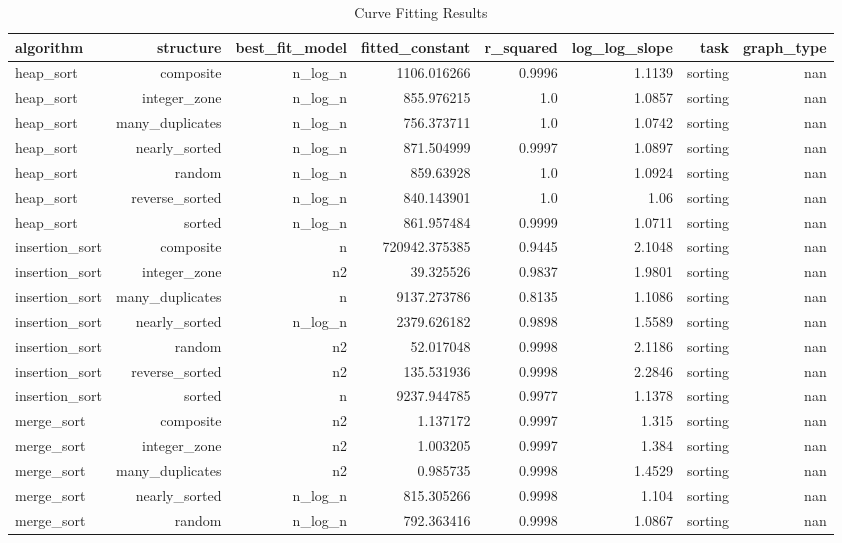 \begin{table}[htbp]
\centering
\caption{Curve Fitting Results}
\label{tab:fit_results}
\begin{tabular}{lrrrrrrr}
\hline
algorithm & structure & best_fit_model & fitted_constant & r_squared & log_log_slope & task & graph_type \\
\hline
heap_sort & composite & n_log_n & 1106.016266 & 0.9996 & 1.1139 & sorting & nan \\
heap_sort & integer_zone & n_log_n & 855.976215 & 1.0 & 1.0857 & sorting & nan \\
heap_sort & many_duplicates & n_log_n & 756.373711 & 1.0 & 1.0742 & sorting & nan \\
heap_sort & nearly_sorted & n_log_n & 871.504999 & 0.9997 & 1.0897 & sorting & nan \\
heap_sort & random & n_log_n & 859.63928 & 1.0 & 1.0924 & sorting & nan \\
heap_sort & reverse_sorted & n_log_n & 840.143901 & 1.0 & 1.06 & sorting & nan \\
heap_sort & sorted & n_log_n & 861.957484 & 0.9999 & 1.0711 & sorting & nan \\
insertion_sort & composite & n & 720942.375385 & 0.9445 & 2.1048 & sorting & nan \\
insertion_sort & integer_zone & n2 & 39.325526 & 0.9837 & 1.9801 & sorting & nan \\
insertion_sort & many_duplicates & n & 9137.273786 & 0.8135 & 1.1086 & sorting & nan \\
insertion_sort & nearly_sorted & n_log_n & 2379.626182 & 0.9898 & 1.5589 & sorting & nan \\
insertion_sort & random & n2 & 52.017048 & 0.9998 & 2.1186 & sorting & nan \\
insertion_sort & reverse_sorted & n2 & 135.531936 & 0.9998 & 2.2846 & sorting & nan \\
insertion_sort & sorted & n & 9237.944785 & 0.9977 & 1.1378 & sorting & nan \\
merge_sort & composite & n2 & 1.137172 & 0.9997 & 1.315 & sorting & nan \\
merge_sort & integer_zone & n2 & 1.003205 & 0.9997 & 1.384 & sorting & nan \\
merge_sort & many_duplicates & n2 & 0.985735 & 0.9998 & 1.4529 & sorting & nan \\
merge_sort & nearly_sorted & n_log_n & 815.305266 & 0.9998 & 1.104 & sorting & nan \\
merge_sort & random & n_log_n & 792.363416 & 0.9998 & 1.0867 & sorting & nan \\

\end{tabular}
\end{table}
